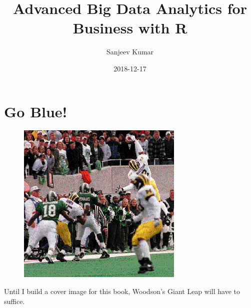 \documentclass[]{krantz}
\title{Advanced Big Data Analytics for Business with R}
\author{Sanjeev Kumar}
\date{2018-12-17}
\renewenvironment{quote}{\begin{VF}}{\end{VF}}
\theoremstyle{definition}
\theoremstyle{definition}
\theoremstyle{definition}
\theoremstyle{remark}
\begin{document}
\maketitle


\thispagestyle{empty}

\begin{center}

\par{}

\end{center}

\setlength{\abovedisplayskip}{-5pt}
\setlength{\abovedisplayshortskip}{-5pt}

{
\hypersetup{linkcolor=black}
\setcounter{tocdepth}{2}
\tableofcontents
}
\listoftables
\listoffigures
\chapter*{Go Blue!}\label{go-blue}


\begin{figure}
\centering
\includegraphics{images/woodson.png}
\caption{}
\end{figure}

\begin{quote}
Until I build a cover image for this book, Woodson's Giant Leap will
have to suffice.
\end{quote}
\end{document}
